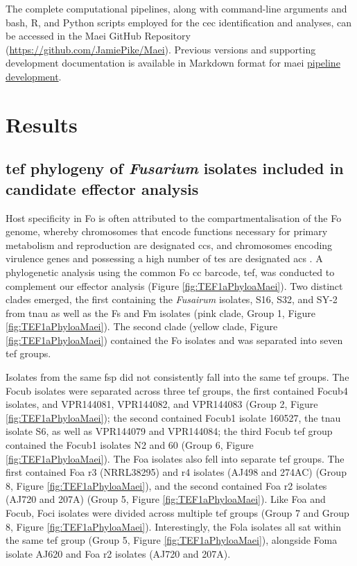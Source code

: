 The complete computational pipelines, along with command-line arguments and bash, R, and Python scripts employed for the \ac{cec} identification and analyses, can be accessed in the Maei GitHub Repository (\href{https://github.com/JamiePike/Maei}{https://github.com/JamiePike/Maei}). Previous versions and supporting development documentation is available in Markdown format for \ac{maei} \href{https://github.com/JamiePike/Maei/tree/main/dev}{pipeline development}.

\newpage
\section{Results}

\subsection{\ac{tef} phylogeny of \textit{Fusarium} isolates included in candidate effector analysis}

Host specificity in \ac{Fo} is often attributed to the compartmentalisation of the \ac{Fo} genome, whereby chromosomes that  encode functions
necessary for primary metabolism and reproduction are designated \acfp{cc}, and chromosomes encoding virulence genes and possessing a high number of \acp{te} are designated \acfp{ac} \parencite{Ma2010, Dam2017}. A phylogenetic analysis using the common \ac{Fo} \ac{cc} barcode, \acf{tef}, was conducted to complement our effector analysis (Figure \ref{fig:TEF1aPhyloaMaei}). Two distinct clades emerged, the first containing the \textit{Fusairum} isolates, S16, S32, and SY-2 from \ac{tnau} as well as the \acl{Fs} and \acl{Fm} isolates (pink clade, Group 1, Figure \ref{fig:TEF1aPhyloaMaei}). The second clade (yellow clade, Figure \ref{fig:TEF1aPhyloaMaei}) contained the \ac{Fo} isolates and was separated into seven \ac{tef} groups.  

Isolates from the same \ac{fsp} did not consistently fall into the same \ac{tef} groups. The \ac{Focub} isolates were separated across three \ac{tef} groups, the first 
contained \ac{Focub4} isolates, and VPR144081, VPR144082, and VPR144083 (Group 2, Figure \ref{fig:TEF1aPhyloaMaei}); the second contained \ac{Focub1} isolate 160527, the \ac{tnau} isolate S6, as well as VPR144079 and VPR144084; the third \ac{Focub} \ac{tef} group contained the \ac{Focub1} isolates N2 and 60 (Group 6, Figure \ref{fig:TEF1aPhyloaMaei}). The \ac{Foa} isolates also fell into separate \ac{tef} groups. The first contained \ac{Foa} \ac{r3} (NRRL38295) and \ac{r4} isolates (AJ498 and 274AC) (Group 8, Figure \ref{fig:TEF1aPhyloaMaei}), and the second contained \ac{Foa} \ac{r2} isolates (AJ720 and 207A) (Group 5, Figure \ref{fig:TEF1aPhyloaMaei}). Like \ac{Foa} and \ac{Focub}, \ac{Foci} isolates were divided across multiple \ac{tef} groups (Group 7 and Group 8, Figure \ref{fig:TEF1aPhyloaMaei}). Interestingly, the \ac{Fola} isolates all sat within the same \ac{tef} group (Group 5, Figure \ref{fig:TEF1aPhyloaMaei}), alongside \ac{Foma} isolate AJ620 and \ac{Foa} \ac{r2} isolates (AJ720 and 207A). 

